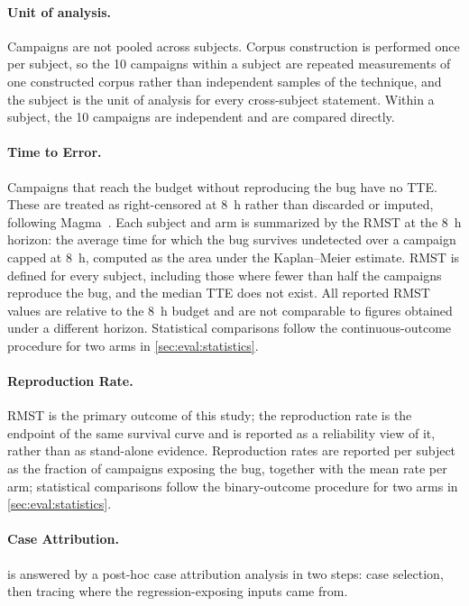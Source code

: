 \paragraph{Unit of analysis.}
Campaigns are not pooled across subjects.
Corpus construction is performed once per subject, so the \num{10} campaigns within a subject are repeated measurements of one constructed corpus rather than independent samples of the technique, and the subject is the unit of analysis for every cross-subject statement.
Within a subject, the \num{10} campaigns are independent and are compared directly.

\paragraph{Time to Error.}
Campaigns that reach the budget without reproducing the bug have no \ac{TTE}.
These are treated as right-censored at \SI{8}{\hour} rather than discarded or imputed, following Magma~\cite{hazimehMagmaGroundTruthFuzzing2020}.
Each subject and arm is summarized by the \ac{RMST} at the \SI{8}{\hour} horizon: the average time for which the bug survives undetected over a campaign capped at \SI{8}{\hour}, computed as the area under the Kaplan--Meier estimate.
\ac{RMST} is defined for every subject, including those where fewer than half the campaigns reproduce the bug, and the median \ac{TTE} does not exist.
All reported \ac{RMST} values are relative to the \SI{8}{\hour} budget and are not comparable to figures obtained under a different horizon.
Statistical comparisons follow the continuous-outcome procedure for two arms in \autoref{sec:eval:statistics}.

\paragraph{Reproduction Rate.}
\ac{RMST} is the primary outcome of this study; the reproduction rate is the endpoint of the same survival curve and is reported as a reliability view of it, rather than as stand-alone evidence.
Reproduction rates are reported per subject as the fraction of campaigns exposing the bug, together with the mean rate per arm; statistical comparisons follow the binary-outcome procedure for two arms in \autoref{sec:eval:statistics}.

\paragraph{Case Attribution.}
 is answered by a post-hoc case attribution analysis in two steps: case selection, then tracing where the regression-exposing inputs came from.

